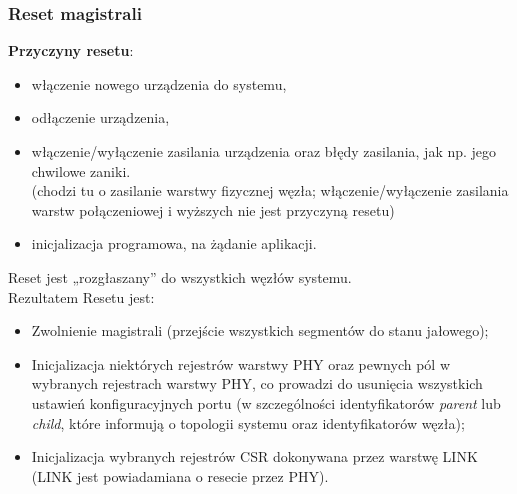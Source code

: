 \subsubsection{Reset magistrali}
\textbf{Przyczyny resetu}:
\begin{itemize}
	\item włączenie nowego urządzenia do systemu,
	\item odłączenie urządzenia,
	\item włączenie/wyłączenie zasilania urządzenia oraz błędy zasilania, jak np. jego chwilowe zaniki.\\
	(chodzi tu o zasilanie warstwy fizycznej węzła; włączenie/wyłączenie zasilania warstw połączeniowej i wyższych nie jest przyczyną resetu)
	\item inicjalizacja programowa, na żądanie aplikacji.
\end{itemize}
Reset jest „rozgłaszany” do wszystkich węzłów systemu.\\
Rezultatem Resetu jest:
\begin{itemize}
	\item Zwolnienie magistrali (przejście wszystkich segmentów do stanu jałowego);
	\item Inicjalizacja niektórych rejestrów warstwy PHY oraz pewnych pól w wybranych rejestrach warstwy PHY, co prowadzi do usunięcia wszystkich ustawień konfiguracyjnych portu (w szczególności identyfikatorów \emph{parent} lub \emph{child}, które informują o topologii systemu oraz identyfikatorów węzła);
	\item Inicjalizacja wybranych rejestrów CSR dokonywana przez warstwę LINK (LINK jest powiadamiana o resecie przez PHY).
\end{itemize}
